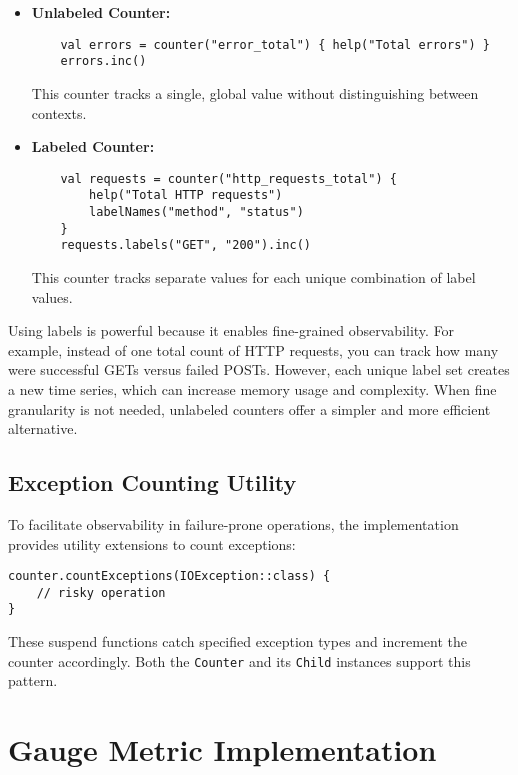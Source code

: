 \begin{itemize}
  \item \textbf{Unlabeled Counter:}
    \begin{verbatim}
    val errors = counter("error_total") { help("Total errors") }
    errors.inc()
    \end{verbatim}
    This counter tracks a single, global value without distinguishing between contexts.

  \item \textbf{Labeled Counter:}
    \begin{verbatim}
    val requests = counter("http_requests_total") {
        help("Total HTTP requests")
        labelNames("method", "status")
    }
    requests.labels("GET", "200").inc()
    \end{verbatim}
    This counter tracks separate values for each unique combination of label values.
\end{itemize}

Using labels is powerful because it enables fine-grained observability. For example, instead of one total count of HTTP requests, you can track how many were successful GETs versus failed POSTs. However, each unique label set creates a new time series, which can increase memory usage and complexity. When fine granularity is not needed, unlabeled counters offer a simpler and more efficient alternative.


\subsection{Exception Counting Utility}
To facilitate observability in failure-prone operations, the implementation provides utility extensions to count exceptions:
\begin{verbatim}
counter.countExceptions(IOException::class) {
    // risky operation
}
\end{verbatim}
These suspend functions catch specified exception types and increment the counter accordingly. Both the \texttt{Counter} and its \texttt{Child} instances support this pattern.





\section{Gauge Metric Implementation}

